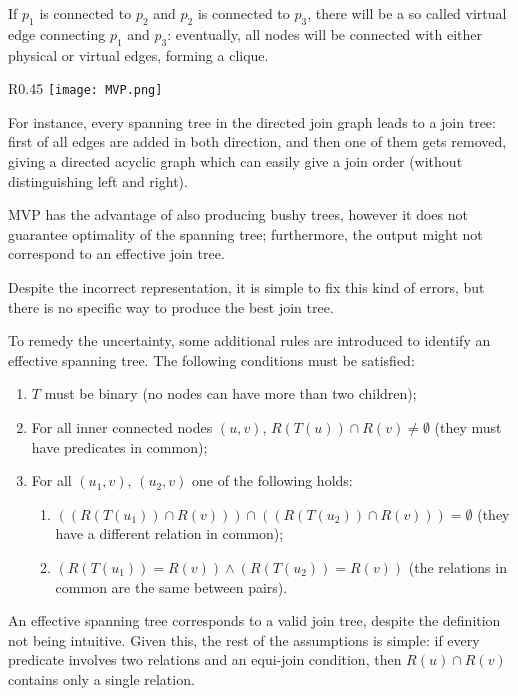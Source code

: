 If $p_1$ is connected to $p_2$ and $p_2$ is connected to $p_3$, there will be a so called virtual edge connecting $p_1$ and $p_3$: eventually, all nodes will be connected with either physical or virtual edges, forming a clique.

\begin{wrapfigure}{R}{0.45\textwidth}
	\vspace{-27pt}
	\texttt{[image: MVP.png]}
	\vspace{-50pt}
\end{wrapfigure}

For instance, every spanning tree in the directed join graph leads to a join tree: first of all edges are added in both direction, and then one of them gets removed, giving a directed acyclic graph which can easily give a join order (without distinguishing left and right).

MVP has the advantage of also producing bushy trees, however it does not guarantee optimality of the spanning tree; furthermore, the output might not correspond to an effective join tree.

Despite the incorrect representation, it is simple to fix this kind of errors, but there is no specific way to produce the best join tree.

To remedy the uncertainty, some additional rules are introduced to identify an effective spanning tree. The following conditions must be satisfied:
\begin{enumerate}
	\item $T$ must be binary (no nodes can have more than two children);
	\item For all inner connected nodes $(u, v)$, $R(T(u)) \cap R(v) \neq \emptyset$ (they must have predicates in common);
	\item For all $(u_1, v)$, $(u_2, v)$ one of the following holds:
	\begin{enumerate}
		\item $((R(T(u_1)) \cap R(v))) \cap ((R(T(u_2)) \cap R(v))) = \emptyset$ (they have a different relation in common);
		\item $(R(T(u_1)) = R(v)) \land (R(T(u_2)) = R(v))$ (the relations in common are the same between pairs).
	\end{enumerate}
\end{enumerate}
An effective spanning tree corresponds to a valid join tree, despite the definition not being intuitive. Given this, the rest of the assumptions is simple: if every predicate involves two relations and an equi-join condition, then $R(u) \cap R(v)$ contains only a single relation.

